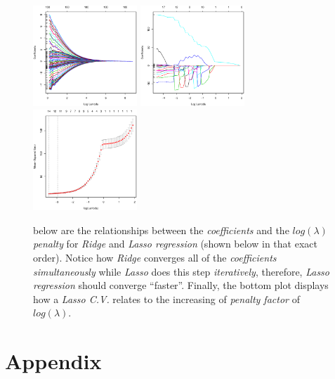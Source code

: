\documentclass[a4paper, twocolumn]{article}
\begin{document}
    \begin{figure}[h!]
        \centering
        \label{fig:lasso_ridge}
        \caption{below are the relationships between the \emph{coefficients} and the \emph{$log(\lambda)$ penalty} for \emph{Ridge} and \emph{Lasso regression} (shown below in that exact order). Notice how \emph{Ridge} converges all of the \emph{coefficients simultaneously} while \emph{Lasso} does this step \emph{iteratively}, therefore, \emph{Lasso regression} should converge ``faster''. Finally, the bottom plot displays how a \emph{Lasso C.V.} relates to the increasing of \emph{penalty factor} of $log(\lambda)$.}
        \includegraphics[width=0.35\textwidth]{share/ridge.eps}
        \includegraphics[width=0.35\textwidth]{share/lasso.eps}
        \includegraphics[width=0.35\textwidth]{share/kfold.eps}
    \end{figure}

    \clearpage \nocite{*}
    
    

    \onecolumn \appendix
    \section*{Appendix}

    
    
    
    
\end{document}
